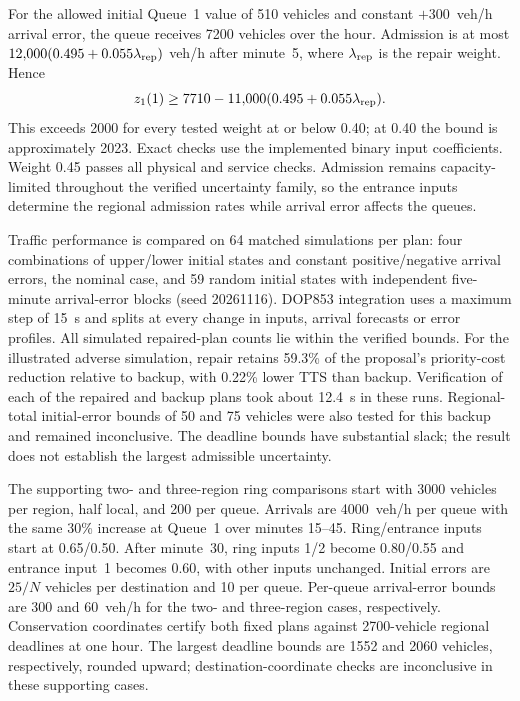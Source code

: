 \documentclass[final]{cas-sc}
\theoremstyle{definition}
\theoremstyle{plain}
\theoremstyle{definition}
\theoremstyle{plain}
\begin{document}
For the allowed initial Queue~1 value of 510 vehicles and constant
$+300$~veh/h arrival error, the queue receives 7200 vehicles over the
hour. Admission is at most $12{,}000(0.495+0.055\lambda_{\rm rep})$ veh/h
after minute~5, where $\lambda_{\rm rep}$ is the repair weight. Hence
\[
z_1(1)\ge7710-11{,}000(0.495+0.055\lambda_{\rm rep}).
\]
This exceeds 2000 for every tested weight at or below 0.40; at 0.40
the bound is approximately 2023. Exact checks use the implemented
binary input coefficients. Weight 0.45 passes all physical and
service checks. Admission remains capacity-limited throughout the
verified uncertainty family, so the entrance inputs determine the
regional admission rates while arrival error affects the queues.

Traffic performance is compared on 64 matched simulations per plan:
four combinations of upper/lower initial states and constant
positive/negative arrival errors, the nominal case, and 59 random
initial states with independent five-minute arrival-error blocks
(seed 20261116). DOP853 integration uses a maximum step of 15~s
and splits at every change in inputs, arrival forecasts or error
profiles. All simulated repaired-plan counts lie within the
verified bounds. For the illustrated adverse simulation, repair retains
59.3\% of the proposal's priority-cost reduction relative to backup,
with 0.22\% lower TTS than backup. Verification of each of the repaired
and backup plans took about 12.4~s in these runs. Regional-total
initial-error bounds of 50 and 75 vehicles were also tested for this
backup and remained inconclusive. The deadline bounds have substantial
slack; the result does not establish the largest admissible uncertainty.

The supporting two- and three-region ring comparisons start with
3000 vehicles per region, half local, and 200 per queue. Arrivals
are 4000~veh/h per queue with the same 30\% increase at Queue~1 over
minutes 15--45. Ring/entrance inputs start at 0.65/0.50. After
minute~30, ring inputs 1/2 become 0.80/0.55 and entrance input~1
becomes 0.60, with other inputs unchanged. Initial errors are $25/N$
vehicles per destination and 10 per queue. Per-queue arrival-error
bounds are 300 and 60~veh/h for the two- and three-region cases,
respectively. Conservation coordinates certify both fixed plans
against 2700-vehicle regional deadlines at one hour. The largest
deadline bounds are 1552 and 2060 vehicles, respectively, rounded
upward; destination-coordinate checks are inconclusive in these
supporting cases.
\end{document}
